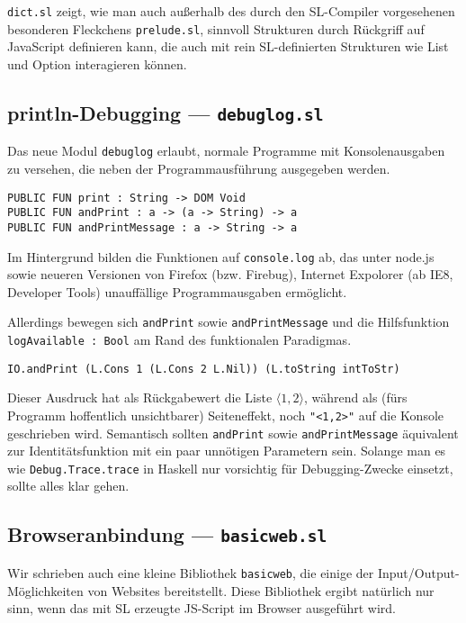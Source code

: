 \documentclass[runningheads]{llncs}
\begin{document}
\verb|dict.sl| zeigt, wie man auch außerhalb des durch den SL-Compiler
vorgesehenen besonderen Fleckchens \verb|prelude.sl|, sinnvoll Strukturen
durch Rückgriff auf JavaScript definieren kann, die auch mit rein
SL-definierten Strukturen wie List und Option interagieren können.

\subsection{println-Debugging --- \texttt{debuglog.sl}}

Das neue Modul \verb|debuglog| erlaubt, normale Programme mit Konsolenausgaben
zu versehen, die neben der Programmausführung ausgegeben werden.

\begin{verbatim}
PUBLIC FUN print : String -> DOM Void
PUBLIC FUN andPrint : a -> (a -> String) -> a
PUBLIC FUN andPrintMessage : a -> String -> a
\end{verbatim}

Im Hintergrund bilden die Funktionen auf \verb|console.log| ab, das unter
node.js sowie neueren Versionen von Firefox (bzw. Firebug), Internet Expolorer
(ab IE8, Developer Tools) unauffällige Programmausgaben ermöglicht.

Allerdings bewegen sich \verb|andPrint| sowie \verb|andPrintMessage| und die
Hilfsfunktion \verb|logAvailable : Bool| am Rand des funktionalen Paradigmas.

\begin{verbatim}
IO.andPrint (L.Cons 1 (L.Cons 2 L.Nil)) (L.toString intToStr)
\end{verbatim}

Dieser Ausdruck hat als Rückgabewert die Liste $\langle1,2\rangle$,
während als (fürs Programm hoffentlich unsichtbarer) Seiteneffekt,
noch \verb|"<1,2>"| auf die Konsole geschrieben wird. Semantisch sollten
\verb|andPrint| sowie \verb|andPrintMessage| äquivalent zur Identitätsfunktion
mit ein paar unnötigen Parametern sein. Solange man es wie
\verb|Debug.Trace.trace| in Haskell nur vorsichtig für Debugging-Zwecke
einsetzt, sollte alles klar gehen.

\subsection{Browseranbindung --- \texttt{basicweb.sl}}

Wir schrieben auch eine kleine Bibliothek \verb|basicweb|, die einige der
Input/Output-Möglichkeiten von Websites bereitstellt. Diese Bibliothek ergibt
natürlich nur sinn, wenn das mit SL erzeugte JS-Script im Browser ausgeführt
wird.
\end{document}

